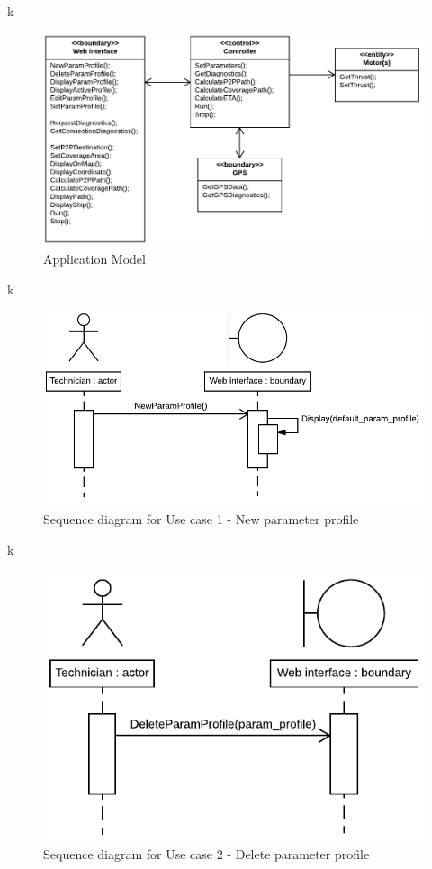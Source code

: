 k

\begin{figure}[H]
	\centering
	\includegraphics[width=1\linewidth]{Images/System_architecture/Application_Model}
	\caption{Application Model}
\end{figure}

k

\begin{figure}[H]
	\centering
	\includegraphics[width=1\linewidth]{Images/System_architecture/Use_case_1_SD}
	\caption{Sequence diagram for Use case 1 - New parameter profile}
\end{figure}

k

\begin{figure}[H]
	\centering
	\includegraphics[width=1\linewidth]{Images/System_architecture/Use_case_2_SD}
	\caption{Sequence diagram for Use case 2 - Delete parameter profile}
\end{figure}


